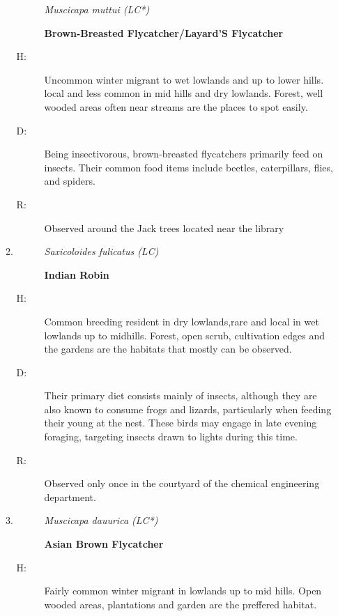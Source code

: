\begin{itemize}
\begin{enumerate}
\begin{description}%
\item[]%
\textit{Muscicapa muttui (LC*)}%
\item[]%
\textbf{Brown{-}Breasted Flycatcher/Layard'S Flycatcher}%
\end{description}%
\begin{description}%
\item[H: ]%
Uncommon winter migrant to wet lowlands and up to lower hills. local and less common in mid hills and dry lowlands. Forest, well wooded areas often near streams are the places to spot easily.%
\item[D: ]%
Being insectivorous, brown{-}breasted flycatchers primarily feed on insects. Their common food items include beetles, caterpillars, flies, and spiders.%
\item[R: ]%
Observed around the Jack trees located near the library%
\end{description}%
\item%
\begin{description}%
\item[]%
\textit{Saxicoloides fulicatus (LC)}%
\item[]%
\textbf{Indian Robin}%
\end{description}%
\begin{description}%
\item[H: ]%
Common breeding resident in dry lowlands,rare and local in wet lowlands up to midhills. Forest, open scrub, cultivation edges and the gardens are the habitats that mostly can be observed.%
\item[D: ]%
Their primary diet consists mainly of insects, although they are also known to consume frogs and lizards, particularly when feeding their young at the nest. These birds may engage in late evening foraging, targeting insects drawn to lights during this time.%
\item[R: ]%
Observed only once in the courtyard of the chemical engineering department.%
\end{description}%
\item%
\begin{description}%
\item[]%
\textit{Muscicapa dauurica (LC*)}%
\item[]%
\textbf{Asian Brown Flycatcher}%
\end{description}%
\begin{description}%
\item[H: ]%
Fairly common winter migrant in lowlands up to mid hills. Open wooded areas, plantations and garden are the preffered habitat.%

\end{description}
\end{enumerate}
\end{itemize}
